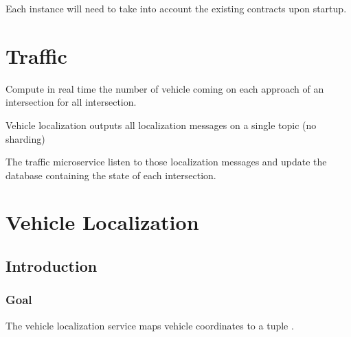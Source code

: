 \documentclass[letterpaper,10pt,english]{sphinxmanual}
\begin{document}
Each instance will need to take into account the existing contracts upon startup.


\section{Traffic}
\label{\detokenize{microservices/traffic/index:traffic}}\label{\detokenize{microservices/traffic/index::doc}}
 Compute in real time the number of vehicle coming on each approach of an intersection for all intersection.

 Vehicle localization outputs all localization messages on a single topic (no sharding)

The traffic microservice listen to those localization messages and update the database containing the state of each intersection.


\section{Vehicle Localization}
\label{\detokenize{microservices/vehicle_localization/index:vehicle-localization}}\label{\detokenize{microservices/vehicle_localization/index:id1}}\label{\detokenize{microservices/vehicle_localization/index::doc}}

\subsection{Introduction}
\label{\detokenize{microservices/vehicle_localization/introduction:introduction}}\label{\detokenize{microservices/vehicle_localization/introduction::doc}}

\subsubsection{Goal}
\label{\detokenize{microservices/vehicle_localization/introduction:goal}}
The vehicle localization service maps vehicle coordinates to a tuple .
\end{document}
